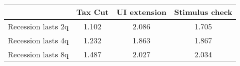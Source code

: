 \begin{tabular}{@{}lccc@{}} 
\toprule 
& Tax Cut    & UI extension    & Stimulus check    \\  \midrule 
Recession lasts 2q &1.102  & 2.086  & 1.705     \\ 
Recession lasts 4q &1.232  & 1.863  & 1.867     \\ 
Recession lasts 8q &1.487  & 2.027  & 2.034     \\ 
\end{tabular}  
